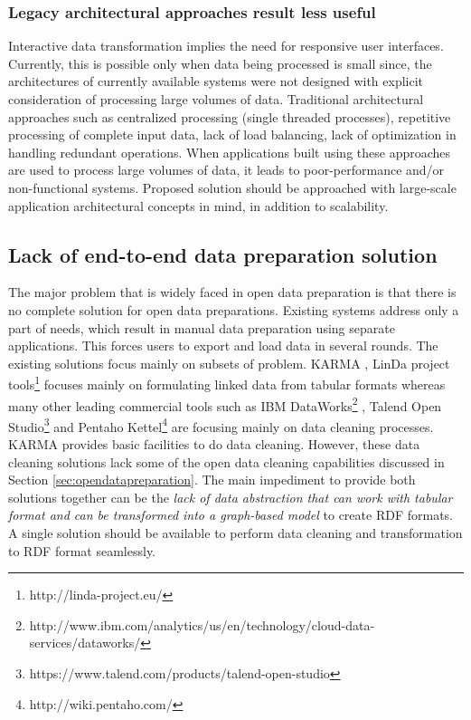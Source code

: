 \subsubsection{Legacy architectural approaches result less useful}
\noindent Interactive data transformation implies the need for responsive user interfaces. Currently, this is possible only when data being processed is small since, the architectures of currently available systems were not designed with explicit consideration of processing large volumes of data. Traditional architectural approaches such as centralized processing (single threaded processes),  repetitive processing of complete input data, lack of load balancing, lack of optimization in handling redundant operations. When applications built using these approaches are used to process large volumes of data, it leads to poor-performance and/or non-functional systems. Proposed solution should be approached with large-scale application architectural concepts in mind, in addition to scalability.

\subsection{Lack of end-to-end data preparation solution}
\noindent The major problem that is widely faced in open data preparation is that there is no complete solution for open data preparations. Existing systems address only a part of needs, which result in manual data preparation using separate applications. This forces users to export and load data in several rounds. The existing solutions focus mainly on subsets of problem. KARMA \cite{karma}, LinDa project tools\footnote{http://linda-project.eu/} focuses mainly on formulating linked data from tabular formats whereas many other leading commercial tools such as IBM DataWorks\footnote{http://www.ibm.com/analytics/us/en/technology/cloud-data-services/dataworks/} , Talend Open Studio\footnote{https://www.talend.com/products/talend-open-studio} and Pentaho Kettel\footnote{http://wiki.pentaho.com/} are focusing mainly on data cleaning processes. KARMA provides basic facilities to do data cleaning. However, these data cleaning solutions lack some of the open data cleaning capabilities discussed in Section \ref{sec:opendatapreparation}. The main impediment to provide both solutions together can be the \textit{ lack of data abstraction that can work with tabular format and can be transformed into a graph-based model} to create RDF formats. A single solution should be available to perform data cleaning and transformation to RDF format seamlessly. 
